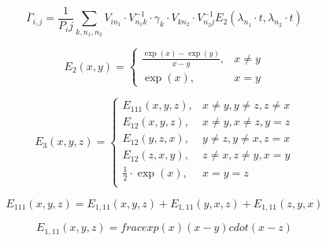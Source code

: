 \documentclass[pdflatex,sn-mathphys-num]{sn-jnl}%
\theoremstyle{thmstyleone}%
\theoremstyle{thmstyletwo}%
\theoremstyle{thmstylethree}%
\begin{document}
\begin{equation}
{\overline \Gamma}_{i,j} = \frac{1}{P_ij}\sum_{k,n_1,n_2} V_{i n_1} \cdot  V^{-1}_{n_1 k} \cdot \gamma_k \cdot V_{k n_2} \cdot V^{-1}_{n_2 j} E_2(\lambda_{n_1} \cdot t, \lambda_{n_2} \cdot t) 
\end{equation}





\begin{equation}
E_2(x,y)= 
\begin{cases}
    \frac{\exp(x)-\exp(y)}{x-y},& x\neq y\\
    \exp(x),              & x=y
\end{cases}
\end{equation}


\begin{equation}
E_3(x,y,z)= 
\begin{cases}
    E_{111}(x,y,z),& x\neq y,y\neq z,z\neq x \\
    E_{12}(x,y,z), & x\neq y,x\neq z,y = z \\
    E_{12}(y,z,x), & y\neq z,y\neq x,z = x \\
    E_{12}(z,x,y), & z\neq x,z\neq y,x = y \\
   \frac {1}{2} \cdot \exp(x) , & x=y=z \\
  
\end{cases}
\end{equation}



\begin{equation}
E_{111}(x,y,z)= E_{1,11}(x, y, z) + E_{1,11}(y, x, z) +   E_{1,11}(z, y, x)
\end{equation}


\begin{equation}
E_{1,11}(x,y,z) = frac {exp(x)} { (x - y) cdot  (x - z)}
\end{equation}



\begin{equation}
\end{equation}
\end{document}
